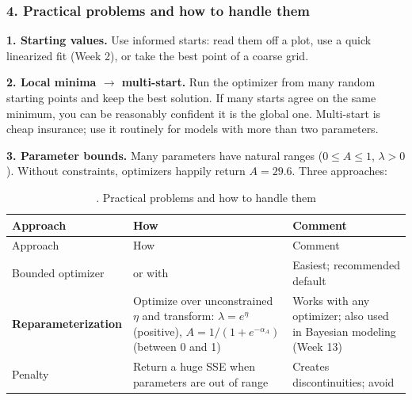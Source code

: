 \subsubsection{4. Practical problems and how to handle them}

\textbf{1. Starting values.} Use informed starts: read them off a plot,
use a quick linearized fit (Week 2), or take the best point of a coarse
grid.

\textbf{2. Local minima \ensuremath{\rightarrow} multi-start.} Run the optimizer from many
random starting points and keep the best solution. If many starts agree
on the same minimum, you can be reasonably confident it is the global
one. Multi-start is cheap insurance; use it routinely for models with
more than two parameters.

\textbf{3. Parameter bounds.} Many parameters have natural ranges
(\(0 \le A \le 1\), \(\lambda > 0\)). Without constraints, optimizers
happily return \(A = 29.6\). Three approaches:

\begin{longtable}[]{@{}
  >{\raggedright\arraybackslash}p{}
  >{\raggedright\arraybackslash}p{}
  >{\raggedright\arraybackslash}p{}@{}}
\caption{. Practical problems and how to handle them}\tabularnewline
\toprule\noalign{}
\begin{minipage}[b]{\linewidth}\raggedright
Approach
\end{minipage} & \begin{minipage}[b]{\linewidth}\raggedright
How
\end{minipage} & \begin{minipage}[b]{\linewidth}\raggedright
Comment
\end{minipage} \\
\midrule\noalign{}
\endfirsthead
\toprule\noalign{}
\begin{minipage}[b]{\linewidth}\raggedright
Approach
\end{minipage} & \begin{minipage}[b]{\linewidth}\raggedright
How
\end{minipage} & \begin{minipage}[b]{\linewidth}\raggedright
Comment
\end{minipage} \\
\midrule\noalign{}
\endhead
\bottomrule\noalign{}
\endlastfoot
Bounded optimizer & or with & Easiest; recommended default \\
\textbf{Reparameterization} & Optimize over unconstrained \(\eta\) and
transform: \(\lambda = e^{\eta}\) (positive),
\(A = 1/(1 + e^{-\alpha_A})\) (between 0 and 1) & Works with any
optimizer; also used in Bayesian modeling (Week 13) \\
Penalty & Return a huge SSE when parameters are out of range & Creates
discontinuities; avoid \\
\end{longtable}


